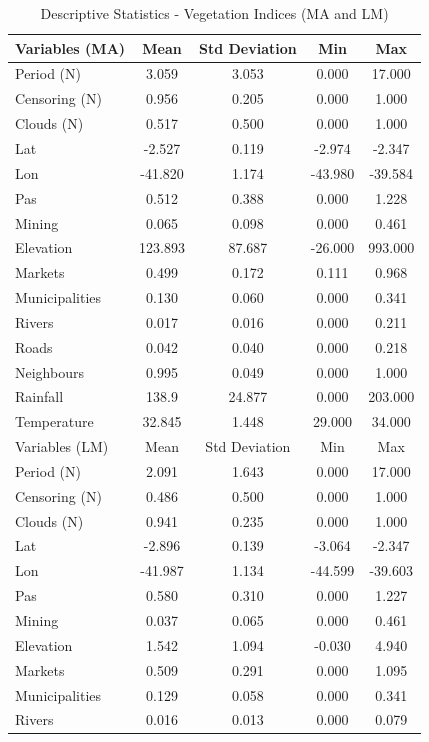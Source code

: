 \begin{table}[H]
\footnotesize
\caption{Descriptive Statistics - Vegetation Indices (MA and LM)}
\begin{tabularx}{\linewidth}{X CCCC}
\hline
\hline
Variables (MA)	&	Mean	&	Std Deviation	&	Min	&	Max	 \\
\hline
Period (N)	&	3.059	&	3.053	&	0.000	&	17.000	\\
Censoring (N)	&	0.956	&	0.205	&	0.000	&	1.000	\\
Clouds (N)	&	0.517	&	0.500	&	0.000	&	1.000	\\
Lat	&	-2.527	&	0.119	&	-2.974	&	-2.347	\\
Lon	&	-41.820	&	1.174	&	-43.980	&	-39.584	\\
Pas	&	0.512	&	0.388	&	0.000	&	1.228	\\
Mining	&	0.065	&	0.098	&	0.000	&	0.461	\\
Elevation	&	123.893	&	87.687	&	-26.000	&	993.000	\\
Markets	&	0.499	&	0.172	&	0.111	&	0.968	\\
Municipalities	&	0.130	&	0.060	&	0.000	&	0.341	\\
Rivers	&	0.017	&	0.016	&	0.000	&	0.211	\\
Roads	&	0.042	&	0.040	&	0.000	&	0.218	\\
Neighbours  & 0.995 &	0.049 &	0.000 &	1.000 \\
Rainfall & 138.9 & 24.877 & 0.000 & 203.000 \\
Temperature  & 32.845 & 1.448 & 29.000 & 34.000 \\
\hline
Variables (LM)	&	Mean	&	Std Deviation	&	Min	&	Max	 \\
\hline
Period (N)	&	2.091	&	1.643	&	0.000	&	17.000	\\
Censoring (N)	&	0.486	&	0.500	&	0.000	&	1.000	\\
Clouds (N)	&	0.941	&	0.235	&	0.000	&	1.000	\\
Lat	&	-2.896	&	0.139	&	-3.064	&	-2.347	\\
Lon	&	-41.987	&	1.134	&	-44.599	&	-39.603	\\
Pas	&	0.580	&	0.310	&	0.000	&	1.227	\\
Mining	&	0.037	&	0.065	&	0.000	&	0.461	\\
Elevation	&	1.542	&	1.094	&	-0.030	&	4.940	\\
Markets	&	0.509	&	0.291	&	0.000	&	1.095	\\
Municipalities	&	0.129	&	0.058	&	0.000	&	0.341	\\
Rivers	&	0.016	&	0.013	&	0.000	&	0.079	\\

\end{tabularx}
\end{table}

